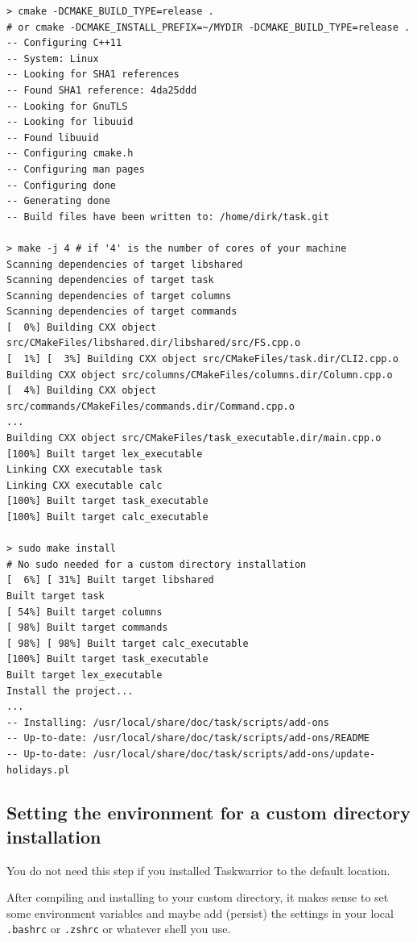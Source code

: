 \documentclass[DIV=12,fontsize=12pt,parskip=half,paper=portrait,%
               headheight=61pt,headinclude=yes,%
               footheight=15pt,footinclude=no]{scrartcl}
\begin{document}
\begin{lstlisting}
> cmake -DCMAKE_BUILD_TYPE=release .
# or cmake -DCMAKE_INSTALL_PREFIX=~/MYDIR -DCMAKE_BUILD_TYPE=release .
-- Configuring C++11
-- System: Linux
-- Looking for SHA1 references
-- Found SHA1 reference: 4da25ddd
-- Looking for GnuTLS
-- Looking for libuuid
-- Found libuuid
-- Configuring cmake.h
-- Configuring man pages
-- Configuring done
-- Generating done
-- Build files have been written to: /home/dirk/task.git

> make -j 4 # if '4' is the number of cores of your machine
Scanning dependencies of target libshared
Scanning dependencies of target task
Scanning dependencies of target columns
Scanning dependencies of target commands
[  0%] Building CXX object src/CMakeFiles/libshared.dir/libshared/src/FS.cpp.o
[  1%] [  3%] Building CXX object src/CMakeFiles/task.dir/CLI2.cpp.o
Building CXX object src/columns/CMakeFiles/columns.dir/Column.cpp.o
[  4%] Building CXX object src/commands/CMakeFiles/commands.dir/Command.cpp.o
...
Building CXX object src/CMakeFiles/task_executable.dir/main.cpp.o
[100%] Built target lex_executable
Linking CXX executable task
Linking CXX executable calc
[100%] Built target task_executable
[100%] Built target calc_executable

> sudo make install
# No sudo needed for a custom directory installation
[  6%] [ 31%] Built target libshared
Built target task
[ 54%] Built target columns
[ 98%] Built target commands
[ 98%] [ 98%] Built target calc_executable
[100%] Built target task_executable
Built target lex_executable
Install the project...
...
-- Installing: /usr/local/share/doc/task/scripts/add-ons
-- Up-to-date: /usr/local/share/doc/task/scripts/add-ons/README
-- Up-to-date: /usr/local/share/doc/task/scripts/add-ons/update-holidays.pl\end{lstlisting}

\subsection{Setting the environment for a custom directory installation}

You do not need this step if you installed Taskwarrior to the default location.

After compiling and installing to your custom directory, it makes sense to set some environment variables and maybe add (persist) the settings in your local \texttt{.bashrc} or \texttt{.zshrc} or whatever shell you use.
\end{document}
